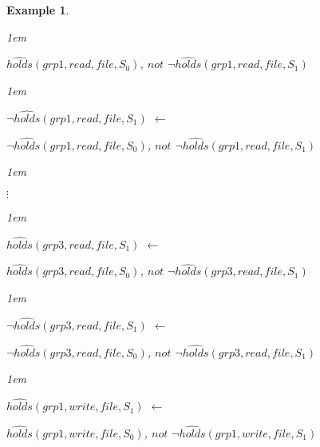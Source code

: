 \documentclass[11pt]{report}
\newtheorem{vexample}{Example}[chapter]
\newenvironment{vquote}
{
  \begin{list}{}{\leftmargin 1em}\item[]
}
{
  \end{list}
}
\begin{document}
\begin{vexample}
\begin{enumerate}
\begin{vquote}
                  \hspace{1em}
                  $\hat{holds}(grp1, read, file, S_{0})$,
                  $not$ $\lnot\hat{holds}(grp1, read, file, S_{1})$
                \end{vquote}

                \begin{vquote}
                  $\lnot\hat{holds}(grp1, read, file, S_{1})$ $\leftarrow$
   
                  \hspace{1em}
                  $\lnot\hat{holds}(grp1, read, file, S_{0})$,
                  $not$ $\lnot\hat{holds}(grp1, read, file, S_{1})$
                \end{vquote}
   
                \begin{vquote}
                  \hspace{2em}$\vdots$
                \end{vquote}
                
                \begin{vquote}
                  $\hat{holds}(grp3, read, file, S_{1})$ $\leftarrow$
                
                  \hspace{1em}
                  $\hat{holds}(grp3, read, file, S_{0})$,
                  $not$ $\lnot\hat{holds}(grp3, read, file, S_{1})$
                \end{vquote}
                
                \begin{vquote}
                  $\lnot\hat{holds}(grp3, read, file, S_{1})$ $\leftarrow$
                
                  \hspace{1em}
                  $\lnot\hat{holds}(grp3, read, file, S_{0})$,
                  $not$ $\lnot\hat{holds}(grp3, read, file, S_{1})$
                \end{vquote}
                
                \begin{vquote}
                  $\hat{holds}(grp1, write, file, S_{1})$ $\leftarrow$
                
                  \hspace{1em}
                  $\hat{holds}(grp1, write, file, S_{0})$,
                  $not$ $\lnot\hat{holds}(grp1, write, file, S_{1})$
                \end{vquote}


\end{enumerate}
\end{vexample}
\end{document}

